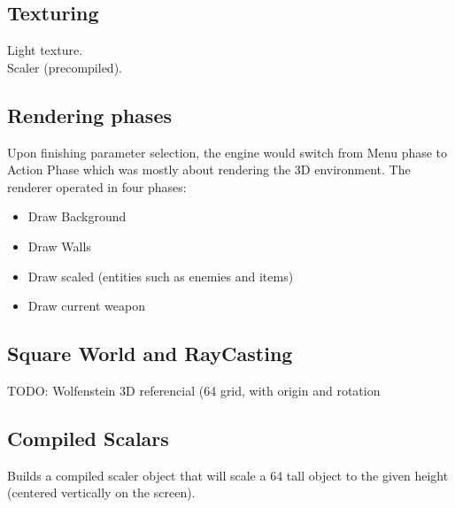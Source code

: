\documentclass[book.tex]{subfiles}
\begin{document}
\subsection{Texturing}
Light texture.\\
Scaler (precompiled).\\


\subsection{Rendering phases}
Upon finishing parameter selection, the engine would switch from Menu phase to Action Phase which was mostly about rendering the 3D environment. The renderer operated in four phases:
\begin{itemize}
   \item Draw Background
   \item Draw Walls
   \item Draw scaled (entities such as enemies and items)
   \item Draw current weapon
\end{itemize}

\subsection{Square World and RayCasting}
TODO: Wolfenstein 3D referencial (64 grid, with origin and rotation
\subsection{Compiled Scalars}
Builds a compiled scaler object that will scale a 64 tall object to the given height (centered vertically on the screen).
\\

\end{document}
